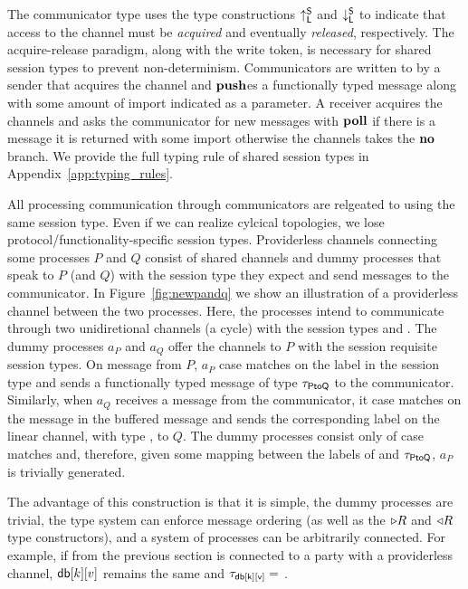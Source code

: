 The communicator type uses the type constructions $\uparrow^{\mathsf{S}}_{\mathsf{L}}$ and $\downarrow^{\mathsf{S}}_{\mathsf{L}}$ to indicate that 
access to the channel must be \emph{acquired} and eventually \emph{released}, respectively.
The acquire-release paradigm, along with the write token, is necessary for shared session types to prevent non-determinism.
Communicators are written to by a sender that acquires the channel and $\mathbf{push}$es a functionally 
typed message along with some amount of import indicated as a parameter. A receiver acquires the 
channels and asks the communicator for new messages with $\mathbf{poll}$ if there is a message it is returned with some import
otherwise the channels takes the $\mathbf{no}$ branch.
We provide the full typing rule of shared session types in Appendix~\ref{app:typing_rules}.

All processing communication through communicators are relgeated to using the same session type. 
Even if we can realize cylcical topologies, we lose protocol/functionality-specific session types.
Providerless channels connecting some processes $P$ and $Q$ consist of shared channels and dummy processes that speak to $P$ (and $Q$) with the session type they expect and send messages to the communicator. 
In Figure~\ref{fig:newpandq} we show an illustration of a providerless channel between the two processes. 
Here, the processes intend to communicate through two unidiretional channels (a cycle) with the session types  and .
The dummy processes $a_P$ and $a_Q$ offer the channels to $P$ with the session requisite session types.
On message from $P$, $a_P$ case matches on the label in the session type and sends a functionally typed message of type $\tau_{\mathsf{PtoQ}}$ to the communicator. 
Similarly, when $a_Q$ receives a message from the communicator, it case matches on the message in the buffered message and sends the corresponding label on the linear channel, with type , to $Q$. 
The dummy processes consist only of case matches and, therefore, given some mapping between the labels of  and $\tau_{\mathsf{PtoQ}}$, $a_P$ is trivially generated. 

The advantage of this construction is that it is simple, the dummy processes are trivial, the type system can enforce message ordering (as well as the $\triangleright{R}$ and $\triangleleft{R}$ type constructors), and a system of processes can be arbitrarily connected. 
For example, if \Fdb from the previous section is connected to a party with a providerless channel, 
$\mathsf{db}[k][v]$ remains the same and $\tau_{\mathsf{db[k][v]}} =$    . 

